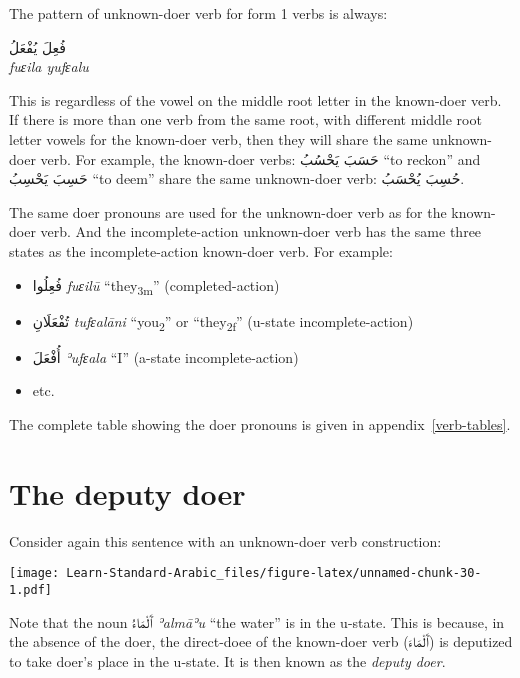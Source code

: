 \documentclass[
  10pt,
]{book}
\providecommand{\tightlist}{%
  \setlength{\itemsep}{0pt}\setlength{\parskip}{0pt}}
\begin{document}
The pattern of unknown-doer verb for form 1 verbs is always:

\foreignlanguage{arabic}{فُعِلَ يُفْعَلُ}\\
\emph{fuɛila yufɛalu}

This is regardless of the vowel on the middle root letter in the known-doer verb.
If there is more than one verb from the same root, with different middle root letter vowels for the known-doer verb, then they will share the same unknown-doer verb. For example, the known-doer verbs: \foreignlanguage{arabic}{حَسَبَ يَحْسُبُ} \enquote{to reckon} and \foreignlanguage{arabic}{حَسِبَ يَحْسِبُ} \enquote{to deem} share the same unknown-doer verb: \foreignlanguage{arabic}{حُسِبَ يُحْسَبُ}.

The same doer pronouns are used for the unknown-doer verb as for the known-doer verb.
And the incomplete-action unknown-doer verb has the same three states as the incomplete-action known-doer verb.
For example:

\begin{itemize}
\tightlist
\item
  \foreignlanguage{arabic}{فُعِلُوا} \emph{fuɛilū} \enquote{they\textsubscript{3m}} (completed-action)
\item
  \foreignlanguage{arabic}{تُفْعَلَانِ} \emph{tufɛalāni} \enquote{you\textsubscript{2}} or \enquote{they\textsubscript{2f}} (u-state incomplete-action)
\item
  \foreignlanguage{arabic}{أُفْعَلَ} \emph{ʾufɛala} \enquote{I} (a-state incomplete-action)
\item
  etc.
\end{itemize}

The complete table showing the doer pronouns is given in appendix~\ref{verb-tables}.

\section{The deputy doer}\label{the-deputy-doer}

Consider again this sentence with an unknown-doer verb construction:

\texttt{[image: Learn-Standard-Arabic\_files/figure-latex/unnamed-chunk-30-1.pdf]}

Note that the noun \foreignlanguage{arabic}{ٱَلْمَاءُ} \emph{ʾalmāʾu} \enquote{the water} is in the u-state. This is because, in the absence of the doer, the direct-doee of the known-doer verb (\foreignlanguage{arabic}{ٱَلْمَاءَ}) is deputized to take doer's place in the u-state. It is then known as the \emph{deputy doer}.
\end{document}
